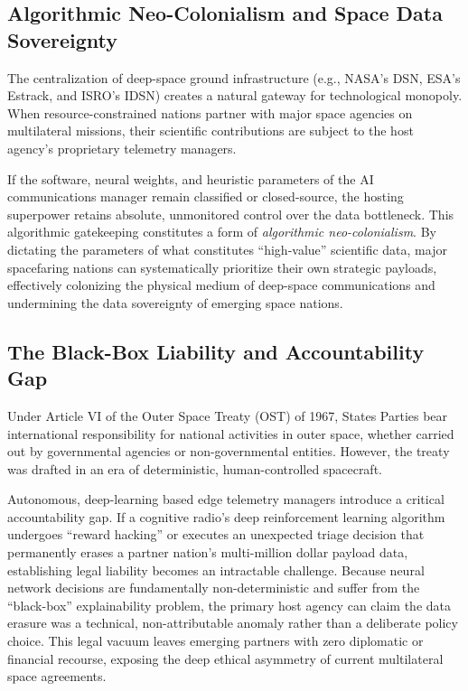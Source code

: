 \documentclass[final,5p,times,twocolumn]{elsarticle}
\begin{document}
\subsection{Algorithmic Neo-Colonialism and Space Data Sovereignty}
The centralization of deep-space ground infrastructure (e.g., NASA's DSN, ESA's Estrack, and ISRO's IDSN) creates a natural gateway for technological monopoly. When resource-constrained nations partner with major space agencies on multilateral missions, their scientific contributions are subject to the host agency's proprietary telemetry managers. 

If the software, neural weights, and heuristic parameters of the AI communications manager remain classified or closed-source, the hosting superpower retains absolute, unmonitored control over the data bottleneck. This algorithmic gatekeeping constitutes a form of \textit{algorithmic neo-colonialism}. By dictating the parameters of what constitutes ``high-value'' scientific data, major spacefaring nations can systematically prioritize their own strategic payloads, effectively colonizing the physical medium of deep-space communications and undermining the data sovereignty of emerging space nations.

\subsection{The Black-Box Liability and Accountability Gap}
Under Article VI of the Outer Space Treaty (OST) of 1967, States Parties bear international responsibility for national activities in outer space, whether carried out by governmental agencies or non-governmental entities. However, the treaty was drafted in an era of deterministic, human-controlled spacecraft. 

Autonomous, deep-learning based edge telemetry managers introduce a critical accountability gap. If a cognitive radio's deep reinforcement learning algorithm undergoes ``reward hacking'' or executes an unexpected triage decision that permanently erases a partner nation's multi-million dollar payload data, establishing legal liability becomes an intractable challenge. Because neural network decisions are fundamentally non-deterministic and suffer from the ``black-box'' explainability problem, the primary host agency can claim the data erasure was a technical, non-attributable anomaly rather than a deliberate policy choice. This legal vacuum leaves emerging partners with zero diplomatic or financial recourse, exposing the deep ethical asymmetry of current multilateral space agreements.
\end{document}
